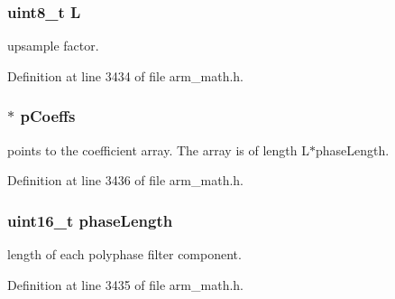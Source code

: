\subsubsection[{\texorpdfstring{L}{L}}]{\setlength{\rightskip}{0pt plus 5cm}uint8\+\_\+t L}\hypertarget{structarm__fir__interpolate__instance__q15_aee73cc056696e504430c53eaa9c58cf0}{}\label{structarm__fir__interpolate__instance__q15_aee73cc056696e504430c53eaa9c58cf0}
upsample factor. 

Definition at line 3434 of file arm\+\_\+math.\+h.

\subsubsection[{\texorpdfstring{p\+Coeffs}{pCoeffs}}]{$\ast$ p\+Coeffs}\hypertarget{structarm__fir__interpolate__instance__q15_a7ca181a37f714d174445f486bebce26f}{}\label{structarm__fir__interpolate__instance__q15_a7ca181a37f714d174445f486bebce26f}
points to the coefficient array. The array is of length L$\ast$phase\+Length. 

Definition at line 3436 of file arm\+\_\+math.\+h.

\subsubsection[{\texorpdfstring{phase\+Length}{phaseLength}}]{\setlength{\rightskip}{0pt plus 5cm}uint16\+\_\+t phase\+Length}\hypertarget{structarm__fir__interpolate__instance__q15_a8f92bb07e0812f94679438cdf412b26a}{}\label{structarm__fir__interpolate__instance__q15_a8f92bb07e0812f94679438cdf412b26a}
length of each polyphase filter component. 

Definition at line 3435 of file arm\+\_\+math.\+h.

